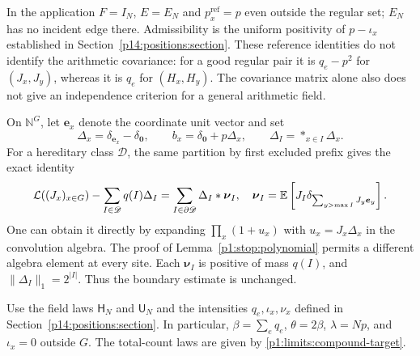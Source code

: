 In the application $F=I_N$, $E=E_N$ and
$p_x^{\mathrm{ref}}=p$ even outside the regular set; $E_N$ has no
incident edge there. Admissibility is the uniform positivity of
$p-\iota_x$ established in Section~\ref{p14:positions:section}.
These reference identities do not identify the arithmetic covariance:
for a good regular pair it is $q_e-p^2$ for $(J_x,J_y)$, whereas it
is $q_e$ for $(H_x,H_y)$. The covariance matrix alone also does not
give an independence criterion for a general arithmetic field.

On $\mathbb N^G$, let $\boldsymbol e_x$ denote the coordinate
unit vector and set
\[
 \Delta_x=\delta_{\boldsymbol e_x}-\delta_{\boldsymbol0},
 \qquad b_x=\delta_{\boldsymbol0}+p\Delta_x,
 \qquad \Delta_I=\mathop{*}_{x\in I}\Delta_x.
\]
For a hereditary class $\mathscr D$, the same partition by first
excluded prefix gives the exact identity
\begin{equation}
 \mathcal L((J_x)_{x\in G})-
       \sum_{I\in\mathscr D}q(I)\Delta_I
 =\sum_{I\in\partial\mathscr D}\Delta_I*\boldsymbol\nu_I,
 \quad
 \boldsymbol\nu_I=
 \mathbb E\left[J_I\delta_{\sum_{y>\max I}J_y\boldsymbol e_y}\right].
 \label{p1:limits:vector-stop}
\end{equation}
One can obtain it directly by expanding
$\prod_x(1+u_x)$ with $u_x=J_x\Delta_x$ in the convolution
algebra.  The proof of Lemma~\ref{p1:stop:polynomial} permits
a different algebra element at every site.  Each
$\boldsymbol\nu_I$ is positive of mass $q(I)$, and
$\|\Delta_I\|_1=2^{|I|}$.  Thus the boundary estimate is
unchanged.

Use the field laws $\mathsf H_N$ and $\mathsf U_N$ and the intensities
$q_e,\iota_x,\nu_x$ defined in Section~\ref{p14:positions:section}. In
particular, $\beta=\sum_e q_e$, $\theta=2\beta$, $\lambda=Np$, and
$\iota_x=0$ outside $G$. The total-count laws are given by
\eqref{p1:limits:compound-target}.

